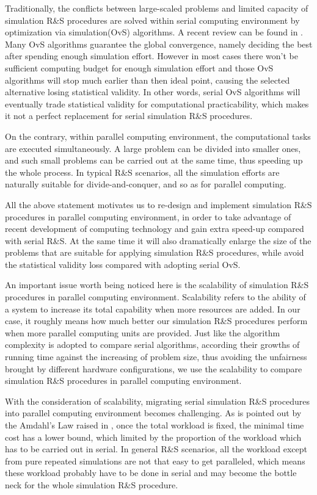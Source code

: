 Traditionally, the conflicts between large-scaled problems and limited capacity of simulation R\&S procedures are solved within serial computing environment by optimization via simulation(OvS) algorithms. A recent review can be found in \cite{potwsc09ovs}. Many OvS algorithms guarantee the global convergence, namely deciding the best after spending enough simulation effort. However in most cases there won't be sufficient computing budget for enough simulation effort and those OvS algorithms will stop much earlier than then ideal point, causing the selected alternative losing statistical validity. In other words, serial OvS algorithms will eventually trade statistical validity for computational practicability, which makes it not a perfect replacement for serial simulation R\&S procedures.

On the contrary, within parallel computing environment, the computational tasks are executed simultaneously. A large problem can be divided into smaller ones, and such small problems can be carried out at the same time, thus speeding up the whole process. In typical R\&S scenarios, all the simulation efforts are naturally suitable for divide-and-conquer, and so as for parallel computing.

All the above statement motivates us to re-design and implement simulation R\&S procedures in parallel computing environment, in order to take advantage of recent development of computing technology and gain extra speed-up compared with serial R\&S. At the same time it will also dramatically enlarge the size of the problems that are suitable for applying simulation R\&S procedures, while avoid the statistical validity loss compared with adopting serial OvS.

An important issue worth being noticed here is the scalability of simulation R\&S procedures in parallel computing environment. Scalability refers to the ability of a system to increase its total capability when more resources are added. In our case, it roughly means how much better our simulation R\&S procedures perform when more parallel computing units are provided. Just like the algorithm complexity is adopted to compare serial algorithms, according their growths of running time against the increasing of problem size, thus avoiding the unfairness brought by different hardware configurations, we use the scalability to compare simulation R\&S procedures in parallel computing environment.

With the consideration of scalability, migrating serial simulation R\&S procedures into parallel computing environment becomes challenging. As is pointed out by the Amdahl's Law raised in \cite{amdahl}, once the total workload is fixed, the minimal time cost has a lower bound, which limited by the proportion of the workload which has to be carried out in serial. In general R\&S scenarios, all the workload except from pure repeated simulations are not that easy to get paralleled, which means these workload probably have to be done in serial and may become the bottle neck for the whole simulation R\&S procedure.

